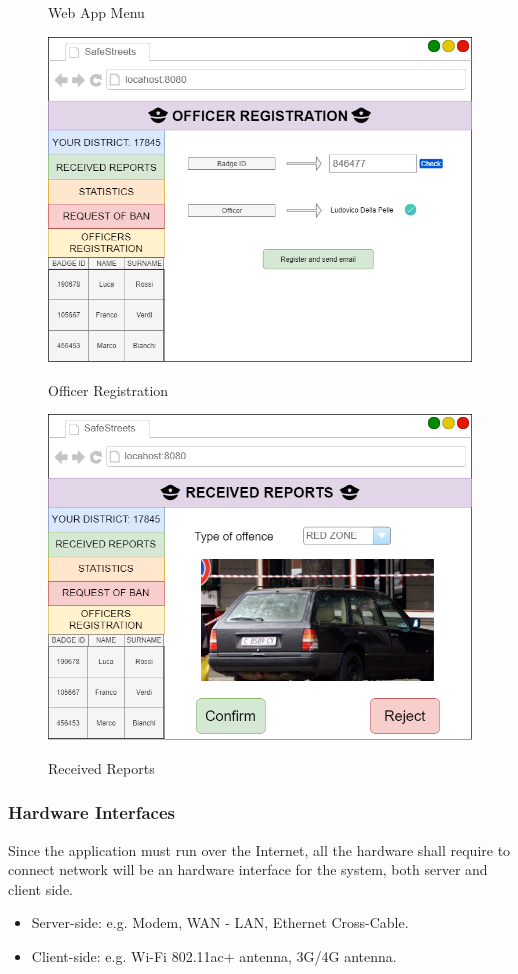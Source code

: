 \documentclass[12pt,a4paper]{article}
\begin{document}
\begin {itemize}
\begin{figure}[H]
			\caption{Web App Menu}
		\end{figure}
		\begin{figure}[H]
			\centering
			{\includegraphics[width=0.8\linewidth]{Images/Mockup/authority/AuthorityWebApp_OfficerRegistration}}
			\caption{Officer Registration}
		\end{figure}
		\begin{figure}[H]
			\centering
			{\includegraphics[width=0.8\linewidth]{Images/Mockup/authority/AuthorityWebApp_ReceivedReports}}
			\caption{Received Reports}
		\end{figure}
\end{itemize}
\newpage
\subsubsection{Hardware Interfaces}
Since the application must run over the Internet, all the hardware shall require to connect network will be an hardware interface for the system, both
server and client side.
\begin{itemize}
\item Server-side: e.g. Modem, WAN - LAN, Ethernet Cross-Cable.
\item Client-side: e.g. Wi-Fi 802.11ac+ antenna, 3G/4G antenna. 
\end{itemize}
\end{document}

